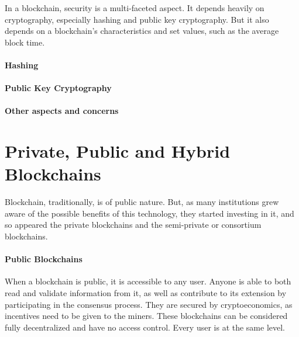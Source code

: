 In a blockchain, security is a multi-faceted aspect. It depends heavily on cryptography, especially hashing and public key cryptography. But it also depends on a blockchain's characteristics and set values, such as the average block time.

\paragraph{Hashing}

\paragraph{Public Key Cryptography}

\paragraph{Other aspects and concerns}

\section{Private, Public and Hybrid Blockchains}

    Blockchain, traditionally, is of public nature. But, as many institutions grew aware of the possible benefits of this technology, they started investing in it, and so appeared the private blockchains and the semi-private or consortium blockchains.
    
    \paragraph{Public Blockchains} When a blockchain is public, it is accessible to any user. Anyone is able to both read and validate information from it, as well as contribute to its extension by participating in the consensus process. They are secured by cryptoeconomics, as incentives need to be given to the miners. These blockchains can be  considered fully decentralized and have no access control. Every user is at the same level.
    
    
